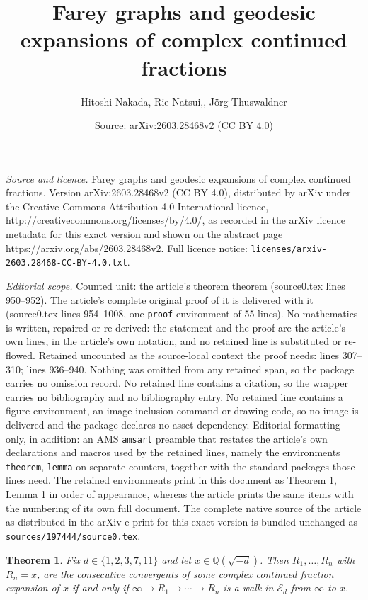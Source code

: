 \documentclass[10pt,a4paper]{amsart}
\title{Farey graphs and geodesic expansions of complex continued fractions}
\author{Hitoshi Nakada, Rie Natsui,, J\"org Thuswaldner}
\date{Source: arXiv:2603.28468v2 (CC BY 4.0)}
\newtheorem{theorem}{Theorem}
\begin{document}
\maketitle

\noindent\emph{Source and licence.} Farey graphs and geodesic expansions of complex continued fractions. Version arXiv:2603.28468v2 (CC BY 4.0), distributed by arXiv under the Creative Commons Attribution 4.0 International licence, http://creativecommons.org/licenses/by/4.0/, as recorded in the arXiv licence metadata for this exact version and shown on the abstract page https://arxiv.org/abs/2603.28468v2. Full licence notice: \texttt{licenses/arxiv-2603.28468-CC-BY-4.0.txt}.\par\smallskip

\noindent\textit{Editorial scope.} Counted unit: the article's theorem theorem (source0.tex lines 950--952). The article's complete original proof of it is delivered with it (source0.tex lines 954--1008, one \texttt{proof} environment of 55 lines). No mathematics is written, repaired or re-derived: the statement and the proof are the article's own lines, in the article's own notation, and no retained line is substituted or re-flowed.  Retained uncounted as the source-local context the proof needs: lines 307--310; lines 936--940.  Nothing was omitted from any retained span, so the package carries no omission record.  No retained line contains a citation, so the wrapper carries no bibliography and no bibliography entry.  No retained line contains a figure environment, an image-inclusion command or drawing code, so no image is delivered and the package declares no asset dependency.  Editorial formatting only, in addition: an AMS \texttt{amsart} preamble that restates the article's own declarations and macros used by the retained lines, namely the environments \texttt{theorem}, \texttt{lemma} on separate counters, together with the standard packages those lines need.  The retained environments print in this document as Theorem 1, Lemma 1 in order of appearance, whereas the article prints the same items with the numbering of its own full document.  The complete native source of the article as distributed in the arXiv e-print for this exact version is bundled unchanged as \texttt{sources/197444/source0.tex}.
\begin{theorem}\label{th:correspondencePathCF}
Fix $d\in\{1,2,3,7,11\}$ and let $x\in \mathbb{Q}(\sqrt{-d})$. Then $R_1,\ldots, R_n$ with $R_n=x$, are the consecutive convergents of some complex continued fraction expansion of $x$ if and only if $\infty \to  R_1 \to \cdots \to  R_n$ is a walk in $\mathcal{E}_{d}$ from 
$\infty$ to $x$.
\end{theorem}
\end{document}
